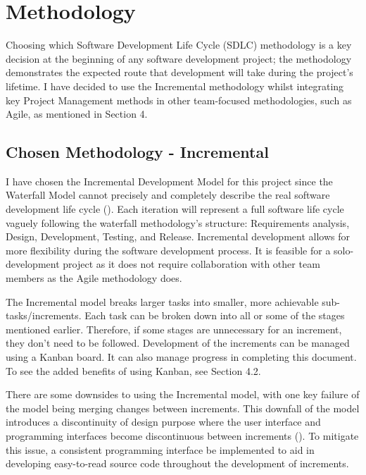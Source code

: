 \chapter{Methodology}
\label{chap:methodology}

Choosing which Software Development Life Cycle (SDLC) methodology is a key decision at the beginning of any software development project; the methodology demonstrates the expected route that development will take during the project's lifetime. I have decided to use the Incremental methodology whilst integrating key Project Management methods in other team-focused methodologies, such as Agile, as mentioned in Section 4.

\section{Chosen Methodology - Incremental}
\label{methodology:chosen}

I have chosen the Incremental Development Model for this project since the Waterfall Model cannot precisely and completely describe the real software development life cycle (\cite{dapeng_liu_case_2011}).
Each iteration will represent a full software life cycle vaguely following the waterfall methodology's structure: Requirements analysis, Design, Development, Testing, and Release. Incremental development allows for more flexibility during the software development process. It is feasible for a solo-development project as it does not require collaboration with other team members as the Agile methodology does.

The Incremental model breaks larger tasks into smaller, more achievable sub-tasks/increments. Each task can be broken down into all or some of the stages mentioned earlier. Therefore, if some stages are unnecessary for an increment, they don't need to be followed. Development of the increments can be managed using a Kanban board. It can also manage progress in completing this document. To see the added benefits of using Kanban, see Section 4.2.

There are some downsides to using the Incremental model, with one key failure of the model being merging changes between increments. This downfall of the model introduces a discontinuity of design purpose where the user interface and programming interfaces become discontinuous between increments (\cite{dapeng_liu_case_2011}). To mitigate this issue, a consistent programming interface be implemented to aid in developing easy-to-read source code throughout the development of increments.